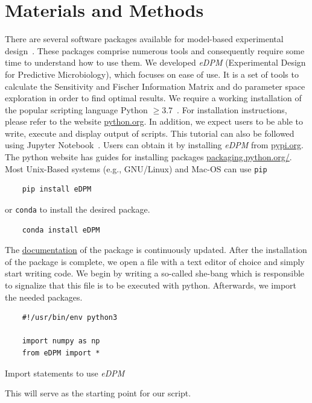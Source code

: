 \documentclass[graybox]{svmult}
\begin{document}
\section{Materials and Methods}
There are several software packages available for model-based experimental design~\cite{balsa-canto_amigo2_2016, zhang_optimal_2018, busetto_near-optimal_2013}.
These packages comprise numerous tools and consequently require some time to understand how to use them.
We developed {\it eDPM} (Experimental Design for Predictive Microbiology), which focuses on ease of use.
It is a set of tools to calculate the Sensitivity and Fischer Information Matrix and do parameter space exploration in order to find optimal results.
We require a working installation of the popular scripting language Python $\geq3.7$~\cite{rossumPythonLanguageReference2010}.
For installation instructions, please refer to the website \href{https://www.python.org/downloads/}{python.org}.
In addition, we expect users to be able to write, execute and display output of scripts.
This tutorial can also be followed using Jupyter Notebook~\cite{jupyterteamJupyterNotebook}.
%
Users can obtain it by installing {\it eDPM} from \href{https://pypi.org/project/edpm/0.0.1/}{pypi.org}.
The python website has guides for installing packages \href{https://packaging.python.org/en/latest/tutorials/installing-packages/}{packaging.python.org/}.
Most Unix-Based systems (e.g., GNU/Linux) and Mac-OS can use \texttt{pip}
\begin{verbatim}
    pip install eDPM
\end{verbatim}
or \texttt{conda} to install the desired package.
\begin{verbatim}
    conda install eDPM
\end{verbatim}
The \href{https://spatial-systems-biology-freiburg.github.io/eDPM/}{documentation} of the package is continuously updated.
After the installation of the package is complete, we open a file with a text editor of choice and simply start writing code.
We begin by writing a so-called she-bang which is responsible to signalize that this file is to be executed with python.
Afterwards, we import the needed packages.
\begin{code}[h]
    \begin{verbatim}
    #!/usr/bin/env python3

    import numpy as np
    from eDPM import *
    \end{verbatim}
    \caption{Import statements to use {\it eDPM}}
    \label{code:import_statements}
\end{code}
This will serve as the starting point for our script.
\end{document}
